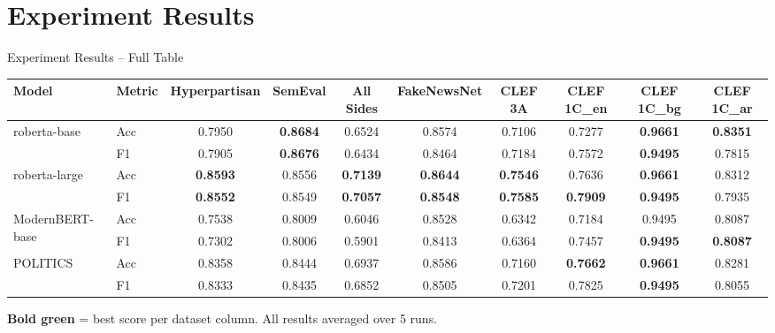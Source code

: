 \documentclass[aspectratio=169]{beamer}
\newcommand{\best}[1]{\textcolor{bestcolor}{\textbf{#1}}}
\begin{document}
\section{Experiment Results}

\begin{frame}{Experiment Results -- Full Table}
  \begin{table}
    \centering
    \scriptsize
    \begin{adjustbox}{max width=\textwidth}
    \begin{tabular}{llcccccccc}
      \toprule
      \textbf{Model} & \textbf{Metric}
        & \textbf{Hyperpartisan} & \textbf{SemEval}
        & \textbf{All Sides} & \textbf{FakeNewsNet}
        & \textbf{CLEF 3A}
        & \textbf{CLEF 1C\_en} & \textbf{CLEF 1C\_bg} & \textbf{CLEF 1C\_ar} \\
      \midrule
      \multirow{2}{*}{roberta-base}
        & Acc & 0.7950          & \best{0.8684} & 0.6524          & 0.8574          & 0.7106          & 0.7277          & \best{0.9661} & \best{0.8351} \\
        & F1  & 0.7905          & \best{0.8676} & 0.6434          & 0.8464          & 0.7184          & 0.7572          & \best{0.9495} & 0.7815 \\
      \midrule
      \multirow{2}{*}{roberta-large}
        & Acc & \best{0.8593}   & 0.8556        & \best{0.7139}   & \best{0.8644}   & \best{0.7546}   & 0.7636          & \best{0.9661} & 0.8312 \\
        & F1  & \best{0.8552}   & 0.8549        & \best{0.7057}   & \best{0.8548}   & \best{0.7585}   & \best{0.7909}   & \best{0.9495} & 0.7935 \\
      \midrule
      \multirow{2}{*}{ModernBERT-base}
        & Acc & 0.7538          & 0.8009        & 0.6046          & 0.8528          & 0.6342          & 0.7184          & 0.9495        & 0.8087 \\
        & F1  & 0.7302          & 0.8006        & 0.5901          & 0.8413          & 0.6364          & 0.7457          & \best{0.9495} & \best{0.8087} \\
      \midrule
      \multirow{2}{*}{POLITICS}
        & Acc & 0.8358          & 0.8444        & 0.6937          & 0.8586          & 0.7160          & \best{0.7662}   & \best{0.9661} & 0.8281 \\
        & F1  & 0.8333          & 0.8435        & 0.6852          & 0.8505          & 0.7201          & 0.7825          & \best{0.9495} & 0.8055 \\
      \bottomrule
    \end{tabular}
    \end{adjustbox}
  \end{table}

  \vspace{0.1cm}
  \centering
  \scriptsize
  \textcolor{bestcolor}{\textbf{Bold green}} = best score per dataset column. All results averaged over 5 runs.
\end{frame}
\end{document}
